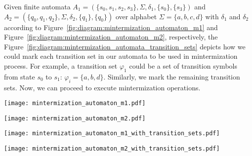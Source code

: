 Given finite automata $A_1 = (\{s_0, s_1, s_2, s_3\}, \Sigma, \delta_1, \{s_0\}, \{s_3\})$ and\\$A_2 = (\{q_0, q_1, q_2\}, \Sigma, \delta_2, \{q_1\}, \{q_0\})$ over alphabet $\Sigma = \{a, b, c, d\}$ with $\delta_1$ and $\delta_2$ according to Figure~\ref{fig:diagram:mintermization_automaton_m1} and Figure~\ref{fig:diagram:mintermization_automaton_m2}, respectively, the Figure~\ref{fig:diagram:mintermization_automata_transition_sets} depicts how we could mark each transition set in our automata to be used in mintermization process. For example, a transition set $\varphi_1$ could be a set of transition symbols from state $s_0$ to $s_1$: $\varphi_i = \{a, b, d\}$. Similarly, we mark the remaining transition sets. Now, we can proceed to execute mintermization operations.

\begin{figure*}[ht]
    \centering
    \begin{minipage}{0.47\linewidth}
        \centering
        \texttt{[image: mintermization\_automaton\_m1.pdf]}
        \caption{Finite automaton $A_1$ with transitions $\delta_1$.}
        \label{fig:diagram:mintermization_automaton_m1}
    \end{minipage}
    \hfill
    \begin{minipage}{0.47\linewidth}
        \centering
        \texttt{[image: mintermization\_automaton\_m2.pdf]}
        \caption{Finite automaton $A_2$ with transitions $\delta_2$.}
        \label{fig:diagram:mintermization_automaton_m2}
    \end{minipage}
    \vspace{0.5cm}
    \caption{Finite automata $A_1$ and $A_2$ used as example automata for mintermization.}
    \label{fig:diagram:mintermization_automata}
\end{figure*}

\begin{figure*}[ht]
    \centering
    \begin{minipage}{0.47\linewidth}
        \centering
        \texttt{[image: mintermization\_automaton\_m1\_with\_transition\_sets.pdf]}
        \caption{Finite automaton $A_1$ with transition sets $\varphi_i$.}
        \label{fig:diagram:mintermization_automaton_m1_with_transition_sets}
    \end{minipage}
    \hfill
    \begin{minipage}{0.47\linewidth}
        \centering
        \texttt{[image: mintermization\_automaton\_m2\_with\_transition\_sets.pdf]}
        \caption{Finite automaton $A_2$ with transition sets $\varphi_i$.}
        \label{fig:diagram:mintermization_automaton_m2_with_transition_sets}
    \end{minipage}
    \vspace{0.5cm}
    \caption{Finite automata $A_1$ and $A_2$ with marked transition sets used in mintermization.}
    \label{fig:diagram:mintermization_automata_transition_sets}
\end{figure*}

